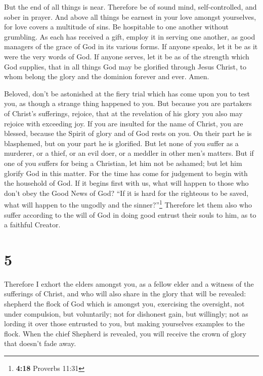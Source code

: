  But the end of all things is near. Therefore be of sound
mind, self-controlled, and sober in prayer.  And above all
things be earnest in your love amongst yourselves, for love covers a
multitude of sins.  Be hospitable to one another without
grumbling.  As each has received a gift, employ it in
serving one another, as good managers of the grace of God in its various
forms.  If anyone speaks, let it be as it were the very
words of God. If anyone serves, let it be as of the strength which God
supplies, that in all things God may be glorified through Jesus Christ,
to whom belong the glory and the dominion forever and ever. Amen.

 Beloved, don't be astonished at the fiery trial which
has come upon you to test you, as though a strange thing happened to
you.  But because you are partakers of Christ's
sufferings, rejoice, that at the revelation of his glory you also may
rejoice with exceeding joy.  If you are insulted for the
name of Christ, you are blessed, because the Spirit of glory and of God
rests on you. On their part he is blasphemed, but on your part he is
glorified.  But let none of you suffer as a murderer, or
a thief, or an evil doer, or a meddler in other men's matters.
 But if one of you suffers for being a Christian, let him
not be ashamed; but let him glorify God in this matter. 
For the time has come for judgement to begin with the household of God.
If it begins first with us, what will happen to those who don't obey the
Good News of God?  ``If it is hard for the righteous to
be saved, what will happen to the ungodly and the sinner?''\footnote{\textbf{4:18}
  Proverbs 11:31}  Therefore let them also who suffer
according to the will of God in doing good entrust their souls to him,
as to a faithful Creator.

\hypertarget{section-4}{%
\section{5}\label{section-4}}

 Therefore I exhort the elders amongst you, as a fellow
elder and a witness of the sufferings of Christ, and who will also share
in the glory that will be revealed:  shepherd the flock of
God which is amongst you, exercising the oversight, not under
compulsion, but voluntarily; not for dishonest gain, but willingly;
 not as lording it over those entrusted to you, but making
yourselves examples to the flock.  When the chief Shepherd
is revealed, you will receive the crown of glory that doesn't fade away.

